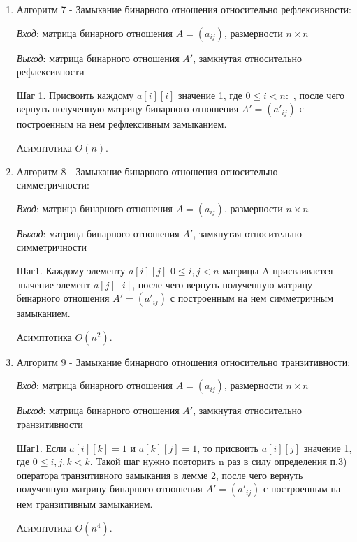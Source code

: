\documentclass[spec, och, labwork]{shiza}
\begin{document}
            \begin{enumerate}
                
                \item Алгоритм 7 - Замыкание бинарного отношения относительно рефлексивности:
                
                \textit{Вход}: матрица бинарного отношения $A = (a_{ij})$, размерности $n \times n$

                \textit{Выход}: матрица бинарного отношения $A'$, замкнутая относительно рефлексивности

                Шаг 1. Присвоить каждому $a[i][i]$ значение 1, где $0 \leq i < n:$ , после чего вернуть полученную матрицу бинарного отношения $A'=(a'_{ij})$ с построенным на нем рефлексивным замыканием.

                Асимптотика $O(n)$.

                \item Алгоритм 8 - Замыкание бинарного отношения относительно симметричности:
                
                \textit{Вход}: матрица бинарного отношения $A = (a_{ij})$, размерности $n \times n$

                \textit{Выход}: матрица бинарного отношения $A'$, замкнутая относительно симметричности

                Шаг1. Каждому элементу $a[i][j]$ $0 \leq i, j < n$ матрицы A присваивается значение элемент
                $a[j][i]$, после чего вернуть полученную матрицу бинарного отношения $A'=(a'_{ij})$ с построенным на нем симметричным замыканием.

                Асимптотика $O(n^2)$.

                \item Алгоритм 9 - Замыкание бинарного отношения относительно транзитивности:
                
                \textit{Вход}: матрица бинарного отношения $A = (a_{ij})$, размерности $n \times n$

                \textit{Выход}: матрица бинарного отношения $A'$, замкнутая относительно транзитивности

                Шаг1. Если $a[i][k] = 1$ и $a[k][j] = 1$, то присвоить $a[i][j]$ значение 1, где $0 \leq i,j,k < k$. Такой шаг нужно повторить n раз
                в силу определения п.3) оператора транзитивного замыкания в лемме 2, после чего вернуть полученную матрицу бинарного отношения $A'=(a'_{ij})$ с построенным на нем транзитивным замыканием.

                Асимптотика $O(n^4)$.
            \end{enumerate}
    
\end{document}
